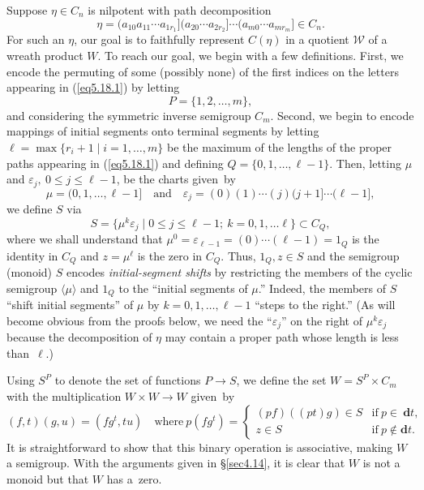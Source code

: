 \documentclass{surv-l}
\numberwithin{equation}{section}
\numberwithin{table}{section}
\numberwithin{figure}{section}
\theoremstyle{definition}
\begin{document}
Suppose $\eta\in C_{n}$ is nilpotent with path decomposition
\begin{equation}\label{eq5.18.1}
\eta=(a_{10}a_{11}\cdots a_{1r_{1}}](a_{20}\cdots a_{2r_{2}}]\cdots(a_{m0}\cdots a_{mr_{m}}]\in C_{n}.
\end{equation}
For such an $\eta$, our goal is to faithfully represent $C(\eta)$
in a quotient $\mathcal{W}$ of a wreath product $W$. To reach our
goal, we begin with a few definitions. First, we encode the
permuting of some (possibly none) of the first indices on the
letters appearing in (\ref{eq5.18.1}) by letting
\[
P=\{1,2,\ldots, m\},
\]
and considering the symmetric inverse semigroup $C_{m}$. Second,
we begin to encode mappings of initial segments onto terminal
segments by letting $\ell= \max\{r_{i}+1\mid i=1,\ldots, m\}$
be the maximum of the lengths of the proper paths appearing in
(\ref{eq5.18.1}) and defining $Q=\{0,1,\ldots, \ell-1\}$. Then,
letting $\mu$ and $\varepsilon_{j},\ 0\leq j\leq \ell-1$, be the
charts given~by
\[
\mu=(0,1,\ldots, \ell-1]\quad \mathrm{and}\quad
\varepsilon_{j}=(0)(1)\cdots(j)(j+1]\cdots (\ell-1],
\]
we define $S$ via
\[
S=\{\mu^{k}\varepsilon_{j}\mid 0\leq j\leq \ell-1;\ k=0,1,\ldots \ell\}\subset C_{Q},
\]
where we shall understand that
$\mu^{0}=\varepsilon_{\ell-1}=(0)\cdots(\ell-1)=1_{Q}$ is the
identity in $C_{Q}$ and $z=\mu^{\ell}$ is the zero in $C_{Q}$.
Thus, $1_{Q},z\in S$ and the semigroup (monoid) $S$ encodes
\emph{initial-segment shifts} by restricting the members of the
cyclic semigroup $\langle\mu\rangle$ and $1_{Q}$ to the ``initial
segments of $\mu$.'' Indeed, the members of $S$ ``shift initial
segments'' of $\mu$ by $k=0,1,\ldots,\ell-1$ ``steps to the
right.'' (As will become obvious from the proofs below, we need
the ``$\varepsilon_{j}$'' on the right of $\mu^{k}\varepsilon_{j}$
because the decomposition of $\eta$ may contain a proper path
whose length is less than~$\ell$.)

Using $S^{P}$ to denote the set of functions $P\rightarrow S$, we
define the set $W= S^{P}\times C_{m}$ with the multiplication
$W\times W\rightarrow W$ given~by
\[
(f,t)(g,u)=(fg^{t}, tu)\quad \mathrm{where}\
p(fg^{t})=\begin{cases}
(pf)((pt)g)\in S &\mathrm{if}\ p\in\ \mathbf{d}t,\\
z\in S & \mathrm{if}\ p\not\in \mathbf{d}t.
\end{cases}
\]
It is straightforward to show that this binary operation is
associative, making $W$ a semigroup. With the arguments given in
\S\ref{sec4.14}, it is clear that $W$ is not a monoid but that $W$
has a~zero.
\end{document}
